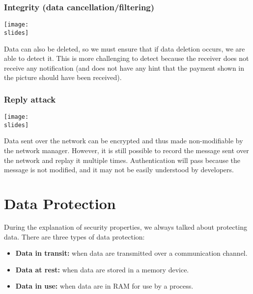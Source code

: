 \subsubsection*{Integrity (data cancellation/filtering)}
\noindent
\begin{minipage}{0.5\textwidth}
  \centering
  \texttt{[image: \\slides]}
\end{minipage}
\hspace{0.05\textwidth}
\begin{minipage}{0.4\textwidth}
  Data can also be deleted, so we must ensure that if data deletion occurs, we are able to detect it. This is more challenging to detect because the receiver does not receive any notification (and does not have any hint that the payment shown in the picture should have been received).
\end{minipage}

\subsubsection*{Reply attack}
\noindent
\begin{minipage}{0.5\textwidth}
  \centering
  \texttt{[image: \\slides]}
\end{minipage}
\hspace{0.05\textwidth}
\begin{minipage}{0.4\textwidth}
  Data sent over the network can be encrypted and thus made non-modifiable by the network manager. However, it is still possible to record the message sent over the network and replay it multiple times. Authentication will pass because the message is not modified, and it may not be easily understood by developers.
\end{minipage}


\section{Data Protection}
During the explanation of security properties, we always talked about protecting data. There are three types of data protection:
\begin{itemize}
  \item \textbf{Data in transit:} when data are transmitted over a communication channel.
  \item \textbf{Data at rest:} when data are stored in a memory device.
  \item \textbf{Data in use:} when data are in RAM for use by a process.
\end{itemize}

